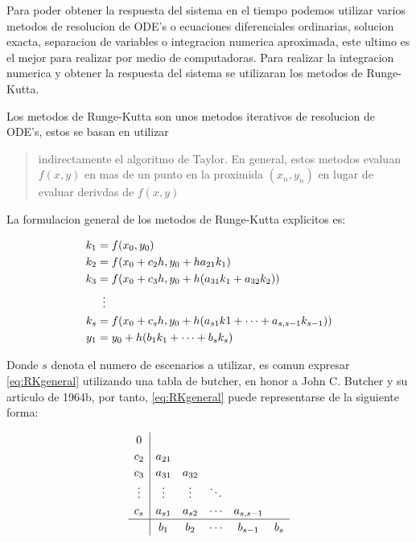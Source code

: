         Para poder obtener la respuesta del sistema en el tiempo podemos utilizar varios metodos de resolucion de ODE's o ecuaciones diferenciales ordinarias, solucion exacta, separacion de variables o integracion numerica aproximada, este ultimo es el mejor para realizar por medio de computadoras. Para realizar la integracion numerica y obtener la respuesta del sistema se utilizaran los metodos de Runge-Kutta.

        Los metodos de Runge-Kutta son unos metodos iterativos de resolucion de ODE's, estos se basan en utilizar \blockquote[{\cite[p.31]{horacio1997metodos}}]{indirectamente el algoritmo de Taylor. En general, estos metodos evaluan $f(x,y)$ en mas de un punto en la proximida $(x_n,y_n)$ en lugar de evaluar derivdas de $f(x,y)$}. La formulacion general de los metodos de Runge-Kutta explicitos es:
        
        \begin{equation}\label{eq:RKgeneral}
            \begin{aligned}
                k_1 &= f(x_0,y_0)\\
                k_2 &= f(x_0 + c_2 h,y_0 + ha_{21}k_1)\\
                k_3 &= f(x_0 + c_3 h,y_0 + h(a_{31}k_1 + a_{32}k_2))\\
                &\mathrel{\makebox[\widthof{=}]{\vdots}}\\
                k_s &= f(x_0 + c_s h,y_0 + h(a_{s1}k1 + \cdots +  a_{s,s-1}k_{s-1}))\\
                y_1 &= y_0 + h(b_1 k_1 + \cdots + b_s k_s)
            \end{aligned}
        \end{equation}
        
        Donde $s$ denota el numero de escenarios a utilizar, es comun expresar \cref{eq:RKgeneral} utilizando una tabla de butcher, en honor a John C. Butcher y su articulo de 1964b, por tanto, \cref{eq:RKgeneral} puede representarse de la siguiente forma:

        \begin{equation}\label{eq:explicitoButcher}
            \renewcommand\arraystretch{1.2}
            \begin{array}
            {c|ccccc}
            0\\
            c_2 & a_{21}\\
            c_3 & a_{31} & a_{32}\\
            \vdots & \vdots & \vdots & \ddots\\
            c_s & a_{s1} & a_{s2} & \cdots & a_{s,s-1}\\
            \hline
            & b_1 & b_2 & \cdots & b_{s-1} &  b_{s}
            \end{array}
        \end{equation}

